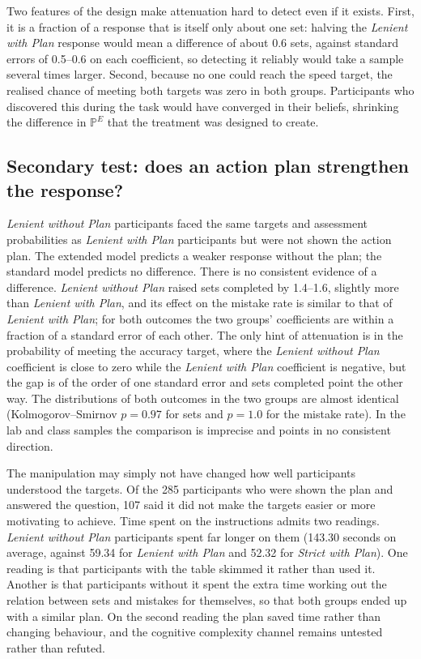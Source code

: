 \documentclass[12pt, letterpaper]{article}
\newcommand{\LPName}{Lenient with Plan}
\newcommand{\SPName}{Strict with Plan}
\newcommand{\LNName}{Lenient without Plan}
\newcommand{\LP}{\textit{\LPName}}
\newcommand{\SP}{\textit{\SPName}}
\newcommand{\LN}{\textit{\LNName}}
\begin{document}
Two features of the design make attenuation hard to detect even if it exists. First, it is a fraction of a response that is itself only about one set: halving the \LP{} response would mean a difference of about 0.6 sets, against standard errors of 0.5--0.6 on each coefficient, so detecting it reliably would take a sample several times larger. Second, because no one could reach the speed target, the realised chance of meeting both targets was zero in both groups. Participants who discovered this during the task would have converged in their beliefs, shrinking the difference in $\mathbb{P}^E$ that the treatment was designed to create.

\subsection{Secondary test: does an action plan strengthen the response?}

\LN{} participants faced the same targets and assessment probabilities as \LP{} participants but were not shown the action plan. The extended model predicts a weaker response without the plan; the standard model predicts no difference. There is no consistent evidence of a difference. \LN{} raised sets completed by 1.4--1.6, slightly more than \LP{}, and its effect on the mistake rate is similar to that of \LP{}; for both outcomes the two groups' coefficients are within a fraction of a standard error of each other. The only hint of attenuation is in the probability of meeting the accuracy target, where the \LN{} coefficient is close to zero while the \LP{} coefficient is negative, but the gap is of the order of one standard error and sets completed point the other way. The distributions of both outcomes in the two groups are almost identical (Kolmogorov--Smirnov $p = 0.97$ for sets and $p = 1.0$ for the mistake rate). In the lab and class samples the comparison is imprecise and points in no consistent direction.

The manipulation may simply not have changed how well participants understood the targets. Of the 285 participants who were shown the plan and answered the question, 107 said it did not make the targets easier or more motivating to achieve. Time spent on the instructions admits two readings. \LN{} participants spent far longer on them (143.30 seconds on average, against 59.34 for \LP{} and 52.32 for \SP{}). One reading is that participants with the table skimmed it rather than used it. Another is that participants without it spent the extra time working out the relation between sets and mistakes for themselves, so that both groups ended up with a similar plan. On the second reading the plan saved time rather than changing behaviour, and the cognitive complexity channel remains untested rather than refuted.
\end{document}
